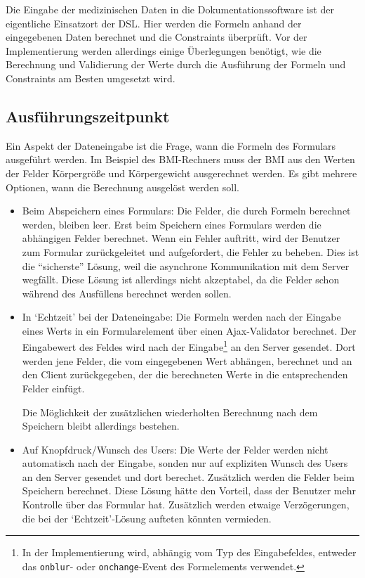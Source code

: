 Die Eingabe der medizinischen Daten in die Dokumentationssoftware ist der eigentliche Einsatzort der DSL. Hier werden die Formeln anhand der eingegebenen Daten berechnet und die Constraints überprüft. Vor der Implementierung werden allerdings einige Überlegungen benötigt, wie die Berechnung und Validierung der Werte durch die Ausführung der Formeln und Constraints am Besten umgesetzt wird.


\subsection{Ausführungszeitpunkt}

Ein Aspekt der Dateneingabe ist die Frage, wann die Formeln des Formulars ausgeführt werden. Im Beispiel des BMI-Rechners muss der BMI aus den Werten der Felder Körpergröße und Körpergewicht ausgerechnet werden. Es gibt mehrere Optionen, wann die Berechnung ausgelöst werden soll.

\begin{itemize}
	\item Beim Abspeichern eines Formulars: Die Felder, die durch Formeln berechnet werden, bleiben leer. Erst beim Speichern eines Formulars werden die abhängigen Felder berechnet. Wenn ein Fehler auftritt, wird der Benutzer zum Formular zurückgeleitet und aufgefordert, die Fehler zu beheben. Dies ist die ``sicherste'' Lösung, weil die asynchrone Kommunikation mit dem Server wegfällt. Diese Lösung ist allerdings nicht akzeptabel, da die Felder schon während des Ausfüllens berechnet werden sollen.

	\item In `Echtzeit' bei der Dateneingabe: Die Formeln werden nach der Eingabe eines Werts in ein Formularelement über einen Ajax-Validator berechnet. Der Eingabewert des Feldes wird nach der Eingabe\footnote{In der Implementierung wird, abhängig vom Typ des Eingabefeldes, entweder das \texttt{onblur}- oder \texttt{onchange}-Event des Formelements verwendet.} an den Server gesendet. Dort werden jene Felder, die vom eingegebenen Wert abhängen, berechnet und an den Client zurückgegeben, der die berechneten Werte in die entsprechenden Felder einfügt.

	Die Möglichkeit der zusätzlichen wiederholten Berechnung nach dem Speichern bleibt allerdings bestehen.

	\item Auf Knopfdruck/Wunsch des Users: Die Werte der Felder werden nicht automatisch nach der Eingabe, sonden nur auf expliziten Wunsch des Users an den Server gesendet und dort berechet. Zu\-sätz\-lich werden die Felder beim Speichern berechnet. Diese Lösung hätte den Vorteil, dass der Benutzer mehr Kontrolle über das Formular hat. Zu\-sätz\-lich werden etwaige Verzögerungen, die bei der `Echtzeit'-Lösung aufteten könnten vermieden.
\end{itemize}

